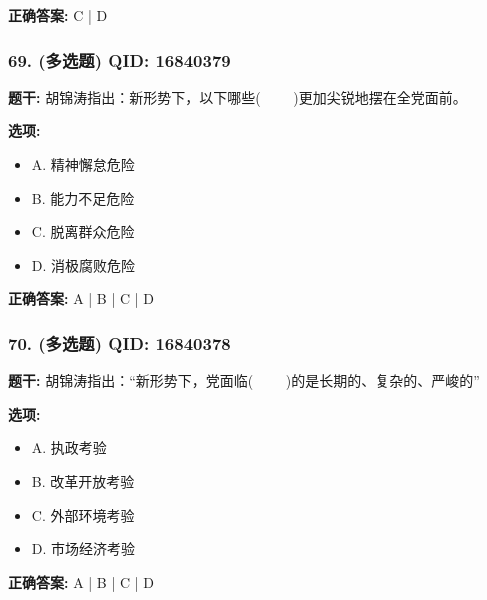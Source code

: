 \documentclass[12pt,UTF8]{ctexart}
\begin{document}
\textbf{正确答案:}
C | D

\vspace{0.3em}\hrulefill\vspace{0.7em}

\subsubsection*{69. (多选题) \small QID: 16840379}

\textbf{题干:}
胡锦涛指出：新形势下，以下哪些(     )更加尖锐地摆在全党面前。

\textbf{选项:}
\begin{itemize}[leftmargin=*]

  \item A. 精神懈怠危险

  \item B. 能力不足危险

  \item C. 脱离群众危险

  \item D. 消极腐败危险

\end{itemize}

\textbf{正确答案:}
A | B | C | D

\vspace{0.3em}\hrulefill\vspace{0.7em}

\subsubsection*{70. (多选题) \small QID: 16840378}

\textbf{题干:}
胡锦涛指出：“新形势下，党面临(     )的是长期的、复杂的、严峻的”

\textbf{选项:}
\begin{itemize}[leftmargin=*]

  \item A. 执政考验

  \item B. 改革开放考验

  \item C. 外部环境考验

  \item D. 市场经济考验

\end{itemize}

\textbf{正确答案:}
A | B | C | D

\vspace{0.3em}\hrulefill\vspace{0.7em}
\end{document}
